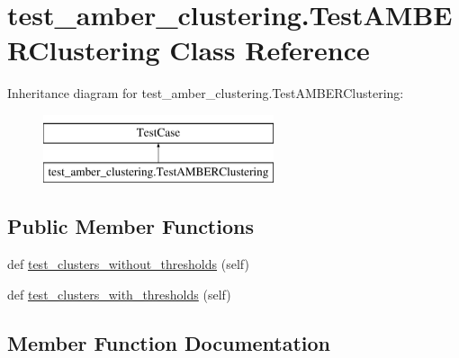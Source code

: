 \hypertarget{classtest__amber__clustering_1_1_test_a_m_b_e_r_clustering}{}\section{test\+\_\+amber\+\_\+clustering.\+Test\+A\+M\+B\+E\+R\+Clustering Class Reference}
\label{classtest__amber__clustering_1_1_test_a_m_b_e_r_clustering}
Inheritance diagram for test\+\_\+amber\+\_\+clustering.\+Test\+A\+M\+B\+E\+R\+Clustering\+:\begin{figure}[H]
\begin{center}
\leavevmode
\includegraphics[height=2.000000cm]{classtest__amber__clustering_1_1_test_a_m_b_e_r_clustering}
\end{center}
\end{figure}
\subsection*{Public Member Functions}
\begin{DoxyCompactItemize}
\item 
def \mbox{\hyperlink{classtest__amber__clustering_1_1_test_a_m_b_e_r_clustering_a22e5b3f3a1c3f56c7cf17f8e566ec058}{test\+\_\+clusters\+\_\+without\+\_\+thresholds}} (self)
\item 
def \mbox{\hyperlink{classtest__amber__clustering_1_1_test_a_m_b_e_r_clustering_aac90db59011cb11f028ac368fb03ef86}{test\+\_\+clusters\+\_\+with\+\_\+thresholds}} (self)
\end{DoxyCompactItemize}


\subsection{Member Function Documentation}
\mbox{\label{classtest__amber__clustering_1_1_test_a_m_b_e_r_clustering_aac90db59011cb11f028ac368fb03ef86}} 
